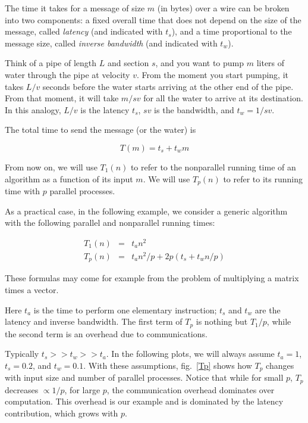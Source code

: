 \documentclass[justified, sixbynine]{tufte-book}
\theoremstyle{plain}%
\newtheorem * {corollary}{Corollary}
\theoremstyle{definition}
\theoremstyle{remark}
\newtheorem * {remark}{Remark}
\newtheorem * {note}{Note}
\begin{document}
\begin{fullwidth}

The time it takes for a message of size $m$ (in bytes) over a wire can be broken into two components: a fixed overall time that does not depend on the size of the message, called {\it latency} (and indicated with $t_s$), and a time proportional to the message size, called {\it inverse bandwidth} (and indicated with $t_w$).

Think of a pipe of length $L$ and section $s$, and you want to pump $m$ liters of water through the pipe at velocity $v$. From the moment you start pumping, it takes $L/v$ seconds before the water starts arriving at the other end of the pipe. From that moment, it will take $m / sv$ for all the water to arrive at its destination. In this analogy, $L/v$ is the latency $t_s$, $sv$ is the bandwidth, and $t_w = 1/sv$.

The total time to send the message (or the water) is

\begin{equation}
T(m) = t_s + t_w m
\end{equation}

From now on, we will use $T_1(n)$ to refer to the nonparallel running time of an algorithm as a function of its input $m$. We will use $T_p(n)$ to refer to its running time with $p$ parallel processes.

As a practical case, in the following example, we consider a generic algorithm with the following parallel and nonparallel running times:

\begin{eqnarray}
T_1(n) &=& t_a n^2 \\
T_p(n) &=& t_a n^2 / p + 2p (t_s+t_w n/p)
\end{eqnarray}

These formulas may come for example from the problem of multiplying a matrix times a vector.

Here $t_a$ is the time to perform one elementary instruction; $t_s$ and $t_w$ are the latency and inverse bandwidth. The first term of $T_p$ is nothing but $T_1/p$, while the second term is an overhead due to communications.

Typically $t_s >> t_w >> t_a$. In the following plots, we will always assume $t_a=1$, $t_s=0.2$, and $t_w=0.1$. With these assumptions, fig.~\ref{Tp} shows how $T_p$ changes with input size and number of parallel processes. Notice that while for small $p$, $T_p$ decreases $\propto 1/p$, for large $p$, the communication overhead dominates over computation. This overhead is our example and is dominated by the latency contribution, which grows with $p$.


\end{fullwidth}
\end{document}

